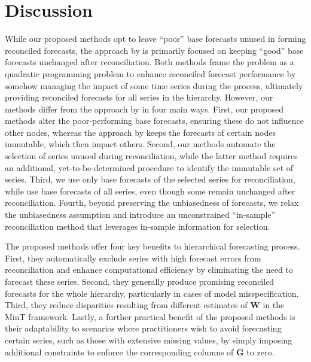 \documentclass[
  11pt]{article}
\theoremstyle{plain}
\theoremstyle{remark}
\begin{document}
\section{Discussion}\label{sec-discussion}

While our proposed methods opt to leave ``poor'' base forecasts unused
in forming reconciled forecasts, the approach by \citet{Zhang2023-op} is
primarily focused on keeping ``good'' base forecasts unchanged after
reconciliation. Both methods frame the problem as a quadratic
programming problem to enhance reconciled forecast performance by
somehow managing the impact of some time series during the process,
ultimately providing reconciled forecasts for all series in the
hierarchy. However, our methods differ from the approach by
\citet{Zhang2023-op} in four main ways. First, our proposed methods
alter the poor-performing base forecasts, ensuring these do not
influence other nodes, whereas the approach by \citet{Zhang2023-op}
keeps the forecasts of certain nodes immutable, which then impact
others. Second, our methods automate the selection of series unused
during reconciliation, while the latter method requires an additional,
yet-to-be-determined procedure to identify the immutable set of series.
Third, we use only base forecasts of the selected series for
reconciliation, while \citet{Zhang2023-op} use base forecasts of all
series, even though some remain unchanged after reconciliation. Fourth,
beyond preserving the unbiasedness of forecasts, we relax the
unbiasedness assumption and introduce an unconstrained ``in-sample''
reconciliation method that leverages in-sample information for
selection.

The proposed methods offer four key benefits to hierarchical forecasting
process. First, they automatically exclude series with high forecast
errors from reconciliation and enhance computational efficiency by
eliminating the need to forecast these series. Second, they generally
produce promising reconciled forecasts for the whole hierarchy,
particularly in cases of model misspecification. Third, they reduce
disparities resulting from different estimates of \(\bm{W}\) in the MinT
framework. Lastly, a further practical benefit of the proposed methods
is their adaptability to scenarios where practitioners wish to avoid
forecasting certain series, such as those with extensive missing values,
by simply imposing additional constraints to enforce the corresponding
columns of \(\bm{G}\) to zero.
\end{document}
